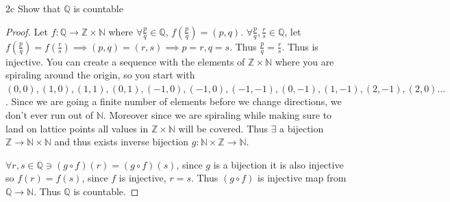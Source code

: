 \documentclass{article}
\newcommand{\Q}{\mathbb{Q}}
\newcommand{\Z}{\mathbb{Z}}
\newcommand{\N}{\mathbb{N}}
\begin{document}
\begin{claim}{2c}\label{Claim 2c.}
    Show that $\Q$  is countable 
\end{claim}
\begin{proof}
    Let $f: \Q \to \Z \times \N$ where $\forall \frac{p}{q} \in \Q$, $f(\frac{p}{q}) = (p, q)$. $\forall \frac{p}{q}, \frac{r}{s} \in \Q$, let $f(\frac{p}{q}) = f\left(\frac{r}{s}\right) \implies (p, q) = (r, s) \implies p = r, q =s$. Thus $\frac{p}{q} = \frac{r}{s}$. Thus is injective. 
    You can create a sequence with the elements of $\Z \times \N$ where you are spiraling around the origin, so you start with $(0, 0), (1, 0), (1, 1), (0, 1), (-1, 0), (-1, 0), (-1, -1), (0, -1), (1, -1), (2, -1), (2, 0)\dots$. Since we are going a finite number of elements before we change directions, we don't ever run out of $\N$. Moreover since we are spiraling while making sure to land on lattice points all values in $\Z \times \N$ will be covered. Thus $\exists$ a bijection $\Z \to \N \times \N$ and thus exists inverse bijection $g : \N \times \Z \to \N$.

    $\forall r, s \in \Q \ni (g \circ f)(r) = (g \circ f)(s)$, since $g$ is a bijection it is also injective so $f(r) = f(s)$, since $f$ is injective, $r = s$. Thus $(g \circ f)$ is injective map from $\Q \to \N$. Thus $\Q$ is countable.        
\end{proof}

\bigskip
\end{document}
